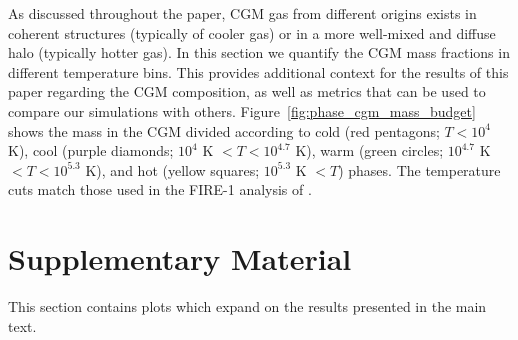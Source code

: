 \documentclass[fleqn,usenatbib]{mnras}
\begin{document}
As discussed throughout the paper, CGM gas from different origins exists in coherent structures (typically of cooler gas) or in a more well-mixed and diffuse halo (typically hotter gas). 
In this section we quantify the CGM mass fractions in different temperature bins. 
This provides additional context for the results of this paper regarding the CGM composition, as well as metrics that can be used to compare our simulations with others.
Figure~\ref{fig:phase_cgm_mass_budget} shows the mass in the CGM divided according to  cold (red pentagons; $T < 10^4$ K), cool (purple diamonds; $10^4$ K $< T < 10^{4.7}$ K), warm (green circles; $10^{4.7}$ K $< T < 10^{5.3}$ K), and hot (yellow squares; $10^{5.3}$ K $< T$) phases. 
The temperature cuts match those used in the FIRE-1 analysis of \cite{Muratov2015}.

\section{Supplementary Material}
\label{sec:supplementary_material}

This section contains plots which expand on the results presented in the main text.
\end{document}
